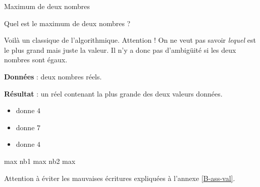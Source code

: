\begin{Fiche}{Maximum de deux nombres}
\label{fiche:max2nb}

	Quel est le maximum de deux nombres ?


	Voilà un classique de l'algorithmique.
	Attention ! On ne veut pas savoir \emph{lequel}
	est le plus grand mais juste la valeur.
	Il n'y a donc pas d'ambigüité si les deux nombres sont égaux.

	\textbf{Données} : deux nombres réels.
		
	\textbf{Résultat} : un réel contenant la plus grande des deux valeurs données.

	\begin{center}	
	\end{center}


	\vspace*{-3mm}
	\begin{multicols}{3}
		\begin{itemize}
		\item {} donne $4$
		\item {} donne $7$
		\item {} donne $4$
		\end{itemize}
	\end{multicols}
	\vspace*{-6mm}
	

	\begin{LDA}
			\Let max \Gets nb1
		\Else
			\Let max \Gets nb2
		\EndIf
		\Return max
	\EndAlgo
	\end{LDA}

	Attention à éviter les mauvaises écritures 
	expliquées à l'annexe \vref{B-ass-val}.




\end{Fiche}
